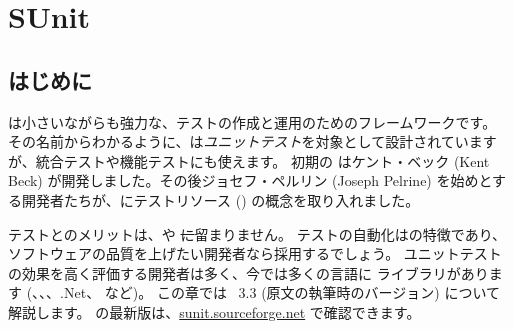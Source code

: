 \documentclass[a4paper,10pt,twoside]{book}
\begin{document}
	\sloppy
\fi
\chapter{SUnit}

\section{はじめに}


 は小さいながらも強力な、テストの作成と運用のためのフレームワークです。
その名前からわかるように、\sunit は\emph{ユニットテスト}を対象として設計されていますが、統合テストや機能テストにも使えます。
初期の \sunit はケント・ベック (Kent Beck) が開発しました。その後ジョセフ・ペルリン (Joseph Pelrine) を始めとする開発者たちが、\sunit にテストリソース () の概念を取り入れました。

テストとのメリットは、\pharo や \st に留まりません。
テストの自動化はの特徴であり、ソフトウェアの品質を上げたい開発者なら採用するでしょう。 
ユニットテストの効果を高く評価する開発者は多く、今では多くの言語に \xUnit ライブラリがあります (、、、.Net、 など)。
この章では \SUnit~3.3 (原文の執筆時のバージョン) について解説します。
\sunit の最新版は、\url{sunit.sourceforge.net} で確認できます。
\end{document}
